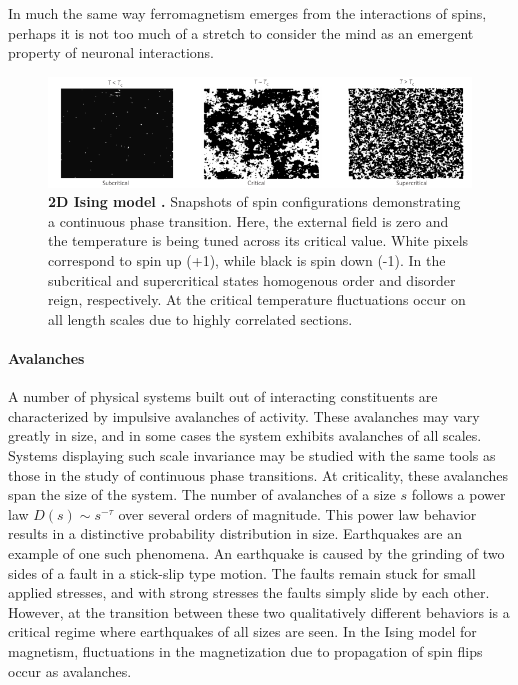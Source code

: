 \documentclass[12pt]{article}
\begin{document}
In much the same way ferromagnetism emerges from the interactions of spins, perhaps it is not too much of a stretch to consider the mind as an emergent property of neuronal interactions. 

\begin{figure}      
  \begin{center}    
 \includegraphics[width=1\textwidth]{Isingchialvo}    
    \caption{\textbf{2D Ising model \cite{Chialvo2010a}.} Snapshots of spin configurations demonstrating a continuous phase transition. Here, the external field is zero and the temperature is being tuned across its critical value. White pixels correspond to spin up (+1), while black is spin down (-1). In the subcritical and supercritical states homogenous order and disorder reign, respectively. At the critical temperature fluctuations occur on all length scales due to highly correlated sections.}  
   \label{Figure::Ising model criticality}   
  \end{center}     
   \end{figure}
 
\paragraph*{Avalanches}

A number of physical systems built out of interacting constituents are characterized by impulsive avalanches of activity. These avalanches may vary greatly in size, and in some cases the system exhibits avalanches of all scales. Systems displaying such scale invariance may be studied with the same tools as those in the study of continuous phase transitions. At criticality, these avalanches span the size of the system. The number of avalanches of a size $s$ follows a power law $ D(s) \sim s^{-\tau} $ over several orders of magnitude. This power law behavior results in a distinctive probability distribution in size. Earthquakes are an example of one such phenomena\cite{Sethna2011a}. An earthquake is caused by the grinding of two sides of a fault in a stick-slip type motion. The faults remain stuck for small applied stresses, and with strong stresses the faults simply slide by each other. However, at the transition between these two qualitatively different behaviors is a critical regime where earthquakes of all sizes are seen. In the Ising model for magnetism, fluctuations in the magnetization due to propagation of spin flips occur as avalanches. 
\end{document}
